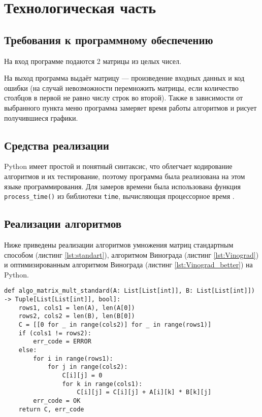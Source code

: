 \section{Технологическая часть}
\subsection{Требования к программному обеспечению}

\hspace{1.20cm}
На вход программе подаются 2 матрицы из целых чисел.

На выход программа выдаёт матрицу --- произведение входных данных и код ошибки (на случай невозможности перемножить матрицы, если количество столбцов в первой не равно числу строк во второй). Также в зависимости от выбранного пункта меню программа замеряет время работы алгоритмов и рисует получившиеся графики.

\subsection{Средства реализации}

\hspace{1.25cm}
Python имеет простой и понятный синтаксис, что облегчает кодирование алгоритмов и их тестирование, поэтому программа была реализована на этом языке программирования. Для замеров времени была использована функция \texttt{process\_time()} из библиотеки \texttt{time}, вычисляющая процессорное время \cite{process_time}.

\subsection{Реализации алгоритмов}

\hspace{1.25cm}
Ниже приведены реализации алгоритмов умножения матриц стандартным способом (листинг \ref{lst:standart}), алгоритмом Винограда (листинг \ref{lst:Vinograd}) и оптимизированным алгоритмом Винограда (листинг \ref{lst:Vinograd_better}) на Python.

\vspace{0.25cm}
\begin{lstlisting}[caption=реализация стандартного алгоритма умножения матриц, label=lst:standart]
def algo_matrix_mult_standard(A: List[List[int]], B: List[List[int]]) -> Tuple[List[List[int]], bool]:
    rows1, cols1 = len(A), len(A[0])
    rows2, cols2 = len(B), len(B[0])
    C = [[0 for _ in range(cols2)] for _ in range(rows1)]
    if (cols1 != rows2):
        err_code = ERROR
    else:
        for i in range(rows1):
            for j in range(cols2):
                C[i][j] = 0
                for k in range(cols1):
                    C[i][j] = C[i][j] + A[i][k] * B[k][j]
        err_code = OK
    return C, err_code
\end{lstlisting}

